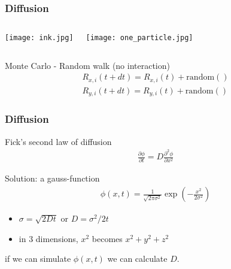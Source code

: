 \documentclass{beamer}
\begin{document}
\begin{frame}[fragile]

    \frametitle{Diffusion}

    \begin{columns}[t]

            \centering

            \texttt{[image: ink.jpg]}


            \texttt{[image: one\_particle.jpg]}

    \end{columns}

    \bigskip
    \bigskip

    Monte Carlo - Random walk (no interaction)
    \begin{align*}
        R_{x,i}(t+dt) = R_{x,i}(t) + \mathrm{random()}\\
        R_{y,i}(t+dt) = R_{y,i}(t) + \mathrm{random()}
    \end{align*}

\end{frame}


\begin{frame}[fragile]

    \frametitle{Diffusion}

    Fick's second law of diffusion
    \begin{align*}
        \frac{\partial \phi }{\partial t} = D \frac{\partial^2 \phi }{\partial x^2}
    \end{align*}

    Solution: a gauss-function
    \begin{align*}
        \phi(x, t) = \frac{1}{\sqrt{2 \pi \sigma^2}} \exp \left (-\frac{x^2}{2 \sigma^2} \right )
    \end{align*}

    \begin{itemize}
        \item $\sigma = \sqrt{2 D t}$ or $D = \sigma^2/2t$
        \item in 3 dimensions, $x^2$ becomes $x^2 + y^2 + z^2$
    \end{itemize}

    if we can simulate $\phi(x,t)$ we can calculate $D$.

\end{frame}
\end{document}
